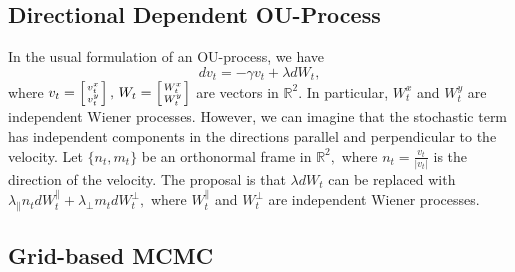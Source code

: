 %
%
%
%

\subsection*{Directional Dependent OU-Process}

In the usual formulation of an OU-process, we have
\begin{equation*}
dv_{t}=-\gamma v_{t}+\lambda dW_{t},
\end{equation*}
where $v_{t}=\left[{v_{t}^{x}\atop v_{t}^{y}}\right],\,W_{t}=\left[{W_{t}^{x}\atop W_{t}^{y}}\right]$
are vectors in $\mathbb{R}^{2}.$ In particular, $W_{t}^{x}$ and
$W_{t}^{y}$ are independent Wiener processes. However, we can imagine
that the stochastic term has independent components in the directions
parallel and perpendicular to the velocity. Let $\{n_{t},m_{t}\}$
be an orthonormal frame in $\mathbb{R}^{2},$ where $n_{t}=\frac{v_{t}}{|v_{t}|}$
is the direction of the velocity. The proposal is that $\lambda dW_{t}$
can be replaced with $\lambda_{\parallel}n_{t}dW_{t}^{\parallel}+\lambda_{\perp}m_{t}dW_{t}^{\perp},$
where $W_{t}^{\parallel}$ and $W_{t}^{\perp}$ are independent Wiener
processes.


\subsection*{Grid-based MCMC}

